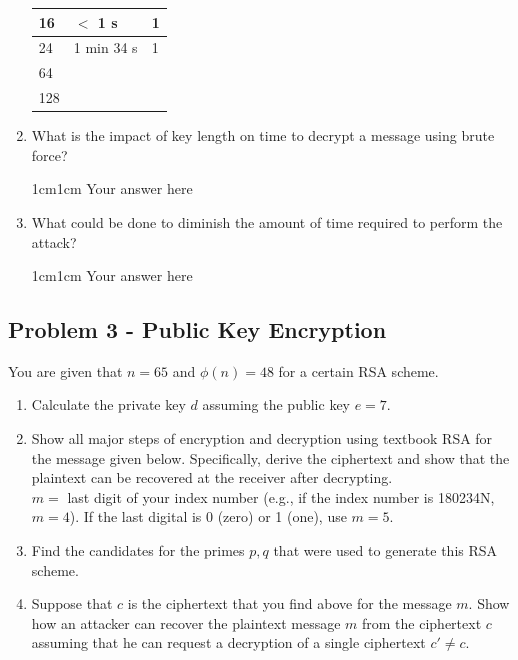 \documentclass[11pt,letterpaper]{article}
\newenvironment{answer}{\em \color{blue} \begin{adjustwidth}{1cm}{1cm}}{\end{adjustwidth}}
\begin{document}
\begin{enumerate}
\begin{table}[h!]
\begin{tabularx}{\columnwidth}{|p{4cm}|X|X|}
				\hline
				16 & $<$ 1 s & 1 \\\hline
				
				\hline
				24 & 1 min 34 s & 1\\ \hline
				
				\hline
				64 & & \\ \hline
				
				\hline
				128 & & \\ \hline
				
			\end{tabularx}
		\end{table}
		\item What is the impact of key length on time to decrypt a message using brute force?
		\begin{answer}
			Your answer here
		\end{answer}
		\item What could be done to diminish the amount of time required to perform the attack?
		\begin{answer}
			Your answer here
		\end{answer}
		
	\end{enumerate}
	
	\subsection*{Problem 3 - Public Key Encryption}
	
	You are given that $n=65$ and $\phi(n)=48$ for a certain RSA scheme.
	\begin{enumerate}
		\item Calculate the private key $d$ assuming the public key $e=7$.
		\item Show all major steps of encryption and decryption using textbook RSA for the message given below. Specifically, derive the ciphertext and show that the plaintext can be recovered at the receiver after decrypting.\\
		$m=$ last digit of your index number (e.g., if the index number is 180234N, $m=4$). If the last digital is 0 (zero) or 1 (one), use $m=5$. 
		\item Find the candidates for the primes $p,q$ that were used to generate this RSA scheme.
		\item Suppose that $c$ is the ciphertext that you find above for the message $m$. Show how an attacker can recover the plaintext message $m$ from the ciphertext $c$ assuming that he can request a decryption of a single ciphertext $c' \neq c$. 
	\end{enumerate}
	
\end{document}
